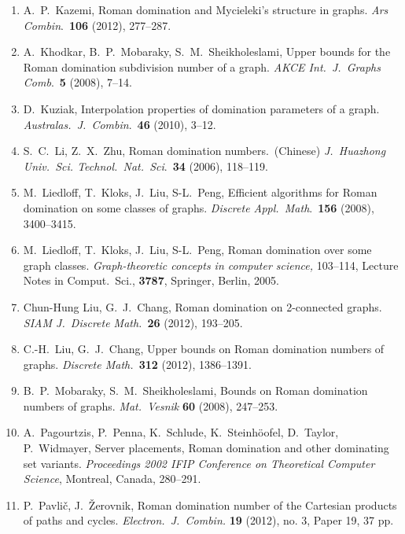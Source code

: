 \documentclass[12pt]{article}%
\begin{document}
\begin{enumerate}
\item A.~P.~Kazemi, Roman domination and Mycieleki's structure in
graphs.\emph{ Ars Combin}.~\textbf{106} (2012), 277--287.

\item A.~Khodkar, B.~P.~Mobaraky, S.~M.~Sheikholeslami, Upper bounds for the
Roman domination subdivision number of a graph. \emph{AKCE Int.~J.~Graphs
Comb}.~\textbf{5} (2008), 7--14.

\item D.~Kuziak, Interpolation properties of domination parameters of a graph.
\emph{Australas.~J.~Combin}.~\textbf{46} (2010), 3--12.

\item S.~C.~Li, Z.~X.~Zhu, Roman domination numbers.~(Chinese)
\emph{J.~Huazhong Univ.~Sci. Technol.~Nat.~Sci}.~\textbf{34} (2006), 118--119.

\item M.~Liedloff, T.~Kloks, J.~Liu, S-L.~Peng, Efficient algorithms for Roman
domination on some classes of graphs. \emph{Discrete Appl.~Math}.~\textbf{156}
(2008), 3400--3415.

\item M.~Liedloff, T.~Kloks, J.~Liu, S-L.~Peng, Roman domination over some
graph classes. \emph{Graph-theoretic concepts in computer science,} 103--114,
Lecture Notes in Comput.~Sci., \textbf{3787}, Springer, Berlin, 2005.

\item Chun-Hung Liu, G.~J.~Chang, Roman domination on 2-connected graphs.
\emph{SIAM J.~Discrete Math.}~\textbf{26} (2012), 193--205.

\item C.-H.~Liu, G.~J.~Chang, Upper bounds on Roman domination numbers of
graphs. \emph{Discrete Math.~}\textbf{312} (2012), 1386--1391.

\item B.~P.~Mobaraky, S.~M.~Sheikholeslami, Bounds on Roman domination numbers
of graphs. \emph{Mat.~Vesnik} \textbf{60} (2008), 247--253.

\item A.~Pagourtzis, P.~Penna, K.~Schlude, K.~Steinh\"{o}ofel, D.~Taylor,
P.~Widmayer, Server placements, Roman domination and other dominating set
variants. \emph{Proceedings 2002 IFIP Conference on Theoretical Computer
Science}, Montreal, Canada, 280--291.

\item P.~Pavli\v{c}, J.~\v{Z}erovnik, Roman domination number of the Cartesian
products of paths and cycles. \emph{Electron.~J.~Combin.} \textbf{19} (2012),
no. 3, Paper 19, 37 pp.


\end{enumerate}
\end{document}
